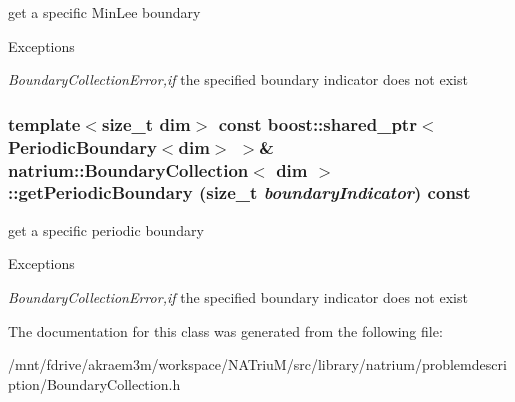 get a specific MinLee boundary 
\begin{DoxyExceptions}{Exceptions}
\item[{\em BoundaryCollectionError,if}]the specified boundary indicator does not exist \end{DoxyExceptions}
\hypertarget{classnatrium_1_1BoundaryCollection_aea0ba68a319b3ec0f3774ba814e18217}{
\subsubsection[{getPeriodicBoundary}]{\setlength{\rightskip}{0pt plus 5cm}template$<$size\_\-t dim$>$ const boost::shared\_\-ptr$<${\bf PeriodicBoundary}$<$dim$>$ $>$\& {\bf natrium::BoundaryCollection}$<$ dim $>$::getPeriodicBoundary (size\_\-t {\em boundaryIndicator}) const}}
\label{classnatrium_1_1BoundaryCollection_aea0ba68a319b3ec0f3774ba814e18217}


get a specific periodic boundary 
\begin{DoxyExceptions}{Exceptions}
\item[{\em BoundaryCollectionError,if}]the specified boundary indicator does not exist \end{DoxyExceptions}


The documentation for this class was generated from the following file:\begin{DoxyCompactItemize}
\item 
/mnt/fdrive/akraem3m/workspace/NATriuM/src/library/natrium/problemdescription/BoundaryCollection.h\end{DoxyCompactItemize}

